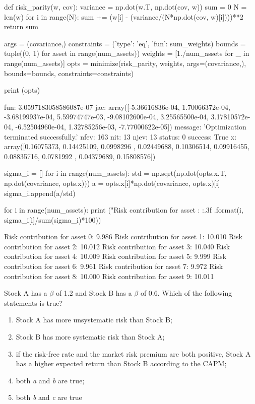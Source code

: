 \cprotEnv \begin{solution}
\begin{ipython}
def risk_parity(w, cov):
    variance = np.dot(w.T, np.dot(cov, w))
    sum = 0 
    N = len(w)
    for i in range(N):
        sum += (w[i] - (variance/(N*np.dot(cov, w)[i])))**2
    return sum

args = (covariance,)
constraints = ({'type': 'eq', 'fun': sum_weights})
bounds = tuple((0, 1) for asset in range(num_assets))
weights = [1./num_assets for _ in range(num_assets)]
opts = minimize(risk_parity, weights, args=(covariance,),
    bounds=bounds, constraints=constraints)

print (opts)
\end{ipython}
\begin{ioutput}
    fun: 3.0597183058586087e-07
    jac: array([-5.36616836e-04,  1.70066372e-04, -3.68199937e-04, 
                 5.59974747e-03, -9.08102600e-04,  3.25565500e-04,  
                 3.17810572e-04, -6.52504960e-04,  1.32785256e-03, 
                -7.77000622e-05])
message: 'Optimization terminated successfully.'
   nfev: 163
    nit: 13
   njev: 13
 status: 0
success: True
      x: array([0.16075373, 0.14425109, 0.0998296 , 0.02449688, 0.10306514,
                0.09916455, 0.08835716, 0.0781992 , 0.04379689, 0.15808576])
\end{ioutput}
\begin{ipython}
sigma_i = []
for i in range(num_assets):
    std = np.sqrt(np.dot(opts.x.T, np.dot(covariance, opts.x)))
    a = opts.x[i]*np.dot(covariance, opts.x)[i]
    sigma_i.append(a/std)

for i in range(num_assets):
    print ("Risk contribution for asset {}: {:.3f}%
        .format(i, sigma_i[i]/sum(sigma_i)*100))
\end{ipython}
\begin{ioutput}
Risk contribution for asset 0: 9.986%
Risk contribution for asset 1: 10.010%
Risk contribution for asset 2: 10.012%
Risk contribution for asset 3: 10.040%
Risk contribution for asset 4: 10.009%
Risk contribution for asset 5: 9.999%
Risk contribution for asset 6: 9.961%
Risk contribution for asset 7: 9.972%
Risk contribution for asset 8: 10.000%
Risk contribution for asset 9: 10.011%
\end{ioutput}
\end{solution}

\begin{question}
Stock A has a $\beta$ of 1.2 and Stock B has a $\beta$ of 0.6. Which of the following statements is true? 
\begin{enumerate}[label=\emph{\alph*})]
\item Stock A has more unsystematic risk than Stock B;
\item Stock B has more systematic risk than Stock A; 
\item if the risk-free rate and the market risk premium are both positive, Stock A has a higher expected return than Stock B according to the CAPM;
\item both \emph{a} and \emph{b} are true;
\item both \emph{b} and \emph{c} are true
\end{enumerate}
\end{question}

